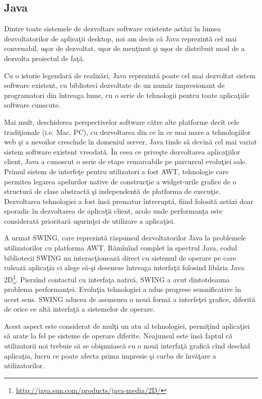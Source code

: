 \subsection{Java}

Dintre toate sistemele de dezvoltare software existente astăzi în lumea 
dezvoltatorilor de aplicaţii desktop, noi am decis că Java reprezintă cel mai 
convenabil, uşor de dezvoltat, uşor de menţinut şi uşor de distribuit mod de a 
dezvolta proiectul de faţă.

Cu o istorie legendară de realizări, Java reprezintă poate cel mai dezvoltat 
sistem software existent, cu biblioteci dezvoltate de un număr impresionant de 
programatori din întreaga lume, cu o serie de tehnologii pentru toate 
aplicaţiile software cunscute.

Mai mult, deschiderea perspectivelor software către alte platforme decît cele 
tradiţionale (i.e. Mac, PC), cu dezvoltarea din ce în ce mai mare a 
tehnologiilor web şi a nevoilor crescînde în domeniul server, Java tinde să 
devină cel mai variat sistem software existent vreodată. În ceea ce priveşte 
dezvoltarea aplicaţiilor client, Java a cunoscut o serie de etape remarcabile 
pe parcursul evoluţiei sale. Primul sistem de interfeţe pentru utilizatori a 
fost AWT, tehnologie care permitea legarea apelurilor native de construcţie a 
widget-urile grafice de o structură de clase abstractă şi independentă de 
platforma de execuţie. Dezvoltarea tehnologiei a fost însă prematur întreruptă, 
fiind folosită astăzi doar sporadic în dezvoltarea de aplicaţii client, acolo 
unde performanţa este considerată prioritară uşurinţei de utilizare a 
aplicaţiei.

A urmat SWING, care reprezintă răspunsul dezvoltatorilor Java la problemele 
utilizatorilor cu platforma AWT. Rămînînd complet în spectrul Java, codul 
bibliotecii SWING nu interacţionează direct cu sistemul de operare pe care 
rulează aplicaţia ci alege să-şi deseneze întreaga interfaţă folosind libăria 
Java 2D\footnote{\url{http://java.sun.com/products/java-media/2D/}}. Pierzînd 
contactul cu interfaţa nativă, SWING a avut dintotdeauna problema performanţei. 
Evoluţia tehnologiei a adus progrese semnificative în acest sens. SWING aducea 
de asemenea o nouă formă a interfeţei grafice, diferită de orice ce altă 
interfaţă a sistemelor de operare.

Acest aspect este considerat de mulţi un atu al tehnologiei, permiţînd 
aplicaţiei să arate la fel pe sisteme de operare diferite. Neajunsul este însă 
faptul că utilizatorii noi trebuie să se obişnuiască cu o nouă interfaţă 
grafică cînd deschid aplicaţia, lucru ce poate afecta prima impresie şi curba 
de învăţare a utilizatorilor.

